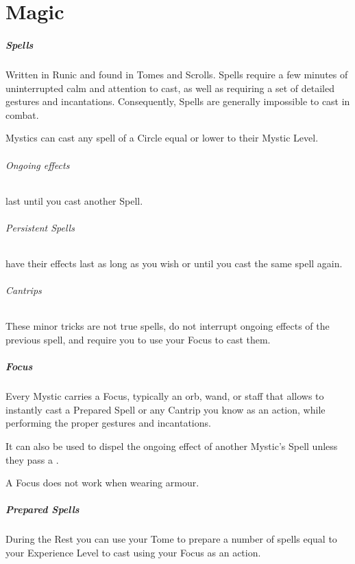 \documentclass[itdr]{subfiles}
\begin{document}
\chapter{Magic}

\paragraph{Spells}
Written in Runic and found in Tomes and Scrolls. Spells require a few minutes of uninterrupted calm and attention to cast, as well as requiring a set of detailed gestures and incantations. Consequently, Spells are generally impossible to cast in combat.

Mystics can cast any spell of a Circle equal or lower to their Mystic Level.

\subparagraph{Ongoing effects} last until you cast another Spell.

\subparagraph{Persistent Spells} have their effects last as long as you wish or until you cast the same spell again.

\subparagraph{Cantrips}
These minor tricks are not true spells, do not interrupt ongoing effects of the previous spell, and require you to use your Focus to cast them.

\paragraph{Focus}
Every Mystic carries a Focus, typically an orb, wand, or staff that allows to instantly cast a Prepared Spell or any Cantrip you know as an action, while performing the proper gestures and incantations.

It can also be used to dispel the ongoing effect of another Mystic's Spell unless they pass a .

A Focus does not work when wearing armour.

\paragraph{Prepared Spells}
During the Rest you can use your Tome to prepare a number of spells equal to your Experience Level to cast using your Focus as an action.
\end{document}
